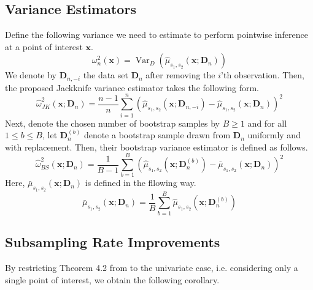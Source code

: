 \documentclass[letterpaper,10pt]{article}
\numberwithin{equation}{section}
\numberwithin{thm}{section}
\renewcommand{\hat}{\widehat}
\newcommand{\1}{\mathbb{1}}
\begin{document}
\subsection{Variance Estimators}
Define the following variance we need to estimate to perform pointwise inference at a point of interest $\mathbf{x}$.
\begin{equation}
	\omega^{2}_{n}\left(\mathbf{x}\right)
	= \operatorname{Var}_{D}\left(\hat{\mu}_{s_1, s_2}\left(\mathbf{x}; \mathbf{D}_n\right)\right)
\end{equation}
We denote by $\mathbf{D}_{n, -i}$ the data set $\mathbf{D}_n$ after removing the $i$'th observation.
Then, the proposed Jackknife variance estimator takes the following form.
\begin{equation}
	\hat{\omega}_{JK}^2\left(\mathbf{x}; \mathbf{D}_n\right)
	= \frac{n-1}{n} \sum_{i = 1}^{n}\left(\hat{\mu}_{s_1, s_2}\left(\mathbf{x}; \mathbf{D}_{n, -i}\right) - \hat{\mu}_{s_1, s_2}\left(\mathbf{x}; \mathbf{D}_{n}\right)\right)^2
\end{equation}
Next, denote the chosen number of bootstrap samples by $B \geq 1$ and for all $1 \leq b \leq B$, let $\mathbf{D}^{(b)}_n$ denote a bootstrap sample drawn from $\mathbf{D}_n$ uniformly and with replacement.
Then, their bootstrap variance estimator is defined as follows.
\begin{equation}
	\hat{\omega}_{BS}^2\left(\mathbf{x}; \mathbf{D}_n\right)
	= \frac{1}{B - 1}\sum_{b = 1}^{B} \left(\hat{\mu}_{s_1, s_2}\left(\mathbf{x}; \mathbf{D}_{n}^{(b)}\right) - \bar{\mu}_{s_1, s_2}\left(\mathbf{x}; \mathbf{D}_{n}\right)\right)^2
\end{equation}
Here, $\bar{\mu}_{s_1, s_2}\left(\mathbf{x}; \mathbf{D}_{n}\right)$ is defined in the fllowing way.
\begin{equation}
	\bar{\mu}_{s_1, s_2}\left(\mathbf{x}; \mathbf{D}_{n}\right)
	= \frac{1}{B} \sum_{b = 1}^{B} \hat{\mu}_{s_1, s_2}\left(\mathbf{x}; \mathbf{D}_{n}^{(b)}\right)
\end{equation}

\subsection{Subsampling Rate Improvements}

By restricting Theorem 4.2 from \citet{ritzwoller_uniform_2024} to the univariate case, i.e. considering only a single point of interest, we obtain the following corollary.
\end{document}

